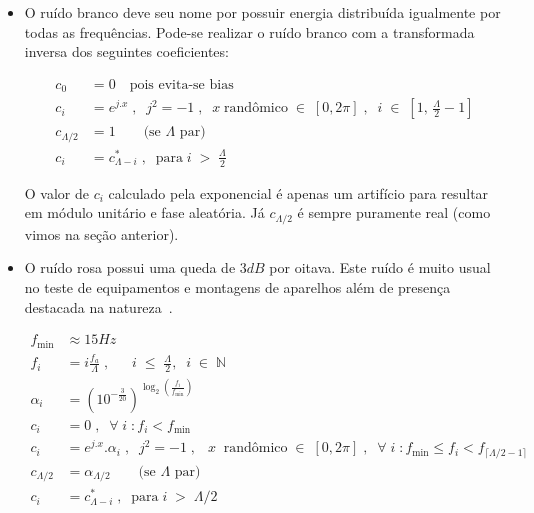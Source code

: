 \begin{itemize}

\item O ruído branco deve seu nome por possuir energia distribuída
igualmente por todas as frequências. Pode-se realizar
o ruído branco com a transformada inversa dos seguintes coeficientes:


\begin{equation}\label{eq:branco}
\begin{split}
c_0 & =0 \quad \text{pois evita-se bias} \\
c_i & =e^{j.x}\;,\;\; j^2=-1 \;, \;\; x \; \text{randômico} \; \in \; [0,2\pi]\;,\;\; i \; \in \; \left[1, \, \frac{\Lambda}{2}-1\right] \\
c_{\Lambda/2} & = 1 \quad\quad \text{(se $\Lambda$ par)}\\ 
c_i & = c_{\Lambda - i}^*\;,\;\; \text{para}\;  i \; > \;  \frac{\Lambda}{2}
\end{split}
\end{equation}

O valor de $c_i$ calculado pela exponencial é apenas um artifício para resultar em módulo unitário e fase aleatória.
Já $c_{\Lambda/2}$ é sempre puramente real (como vimos na seção anterior).

\item O ruído rosa possui uma queda de $3dB$ por oitava. Este ruído é muito usual no teste de equipamentos e montagens de aparelhos além de presença destacada na natureza~\cite{Roederer}. 

\begin{equation}\label{eq:rosa}
\begin{split}
f_{\text{min}} & \approx 15 Hz \\
f_i & = i \frac{f_a}{\Lambda} \;, \;\; \quad i \;\leq\; \frac{\Lambda}{2},\;\; i\;\in\;\mathbb{N}  \\
\alpha_i & = \left(10^{-\frac{3}{20}}\right)^{\log _2 \left ( \frac{f_i}{f_{\text{min}}} \right )}  \\
c_i & =0\;,\;\; \forall \; i \; : f_i<f_{\text{min}} \\
c_i & =e^{j.x} . \alpha_i\;,\;\; j^2=-1 \;, \;\;\  x \;\; \text{randômico} \; \in \; [0,2\pi]\;,\;\; \forall \; i \; : f_{\text{min}} \le f_i < f_{\lceil \Lambda/2-1 \rceil}  \\
c_{\Lambda/2} & = \alpha_{\Lambda/2} \quad\quad \text{(se $\Lambda$ par)}\\ 
c_i & = c_{\Lambda - i}^*\;,\;\; \text{para}\;  i \; > \;  \Lambda/2
\end{split}
\end{equation}


\end{itemize}
